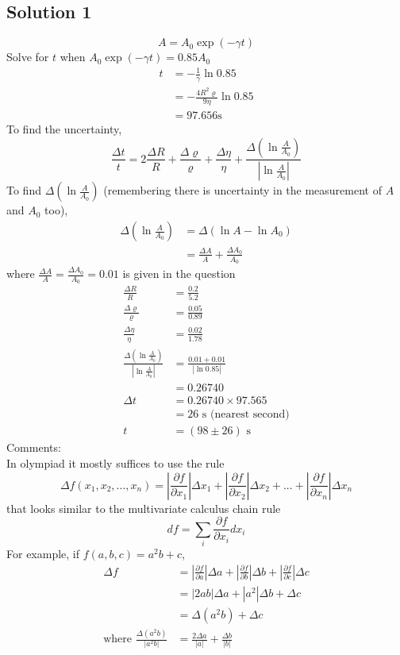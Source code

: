 \documentclass{article}
\begin{document}
\subsection{Solution 1}
\[A=A_0 \exp{(-\gamma t)}\]
Solve for $t$ when $A_0\exp{(-\gamma t)} = 0.85 A_0$
\begin{align}
	t &= -\frac{1}{\gamma} \ln{0.85} \\
	&= -\frac{4R^2\varrho}{9\eta} \ln{0.85} \\
	&= 97.656\text{s}
\end{align}
To find the uncertainty,
\[\frac{\Delta t}{t} = 2\frac{\Delta R}{R} + \frac{\Delta \varrho}{\varrho} + \frac{\Delta \eta}{\eta} + \frac{\Delta \left(\ln\frac{A}{A_0} \right)}{\left|\ln{\frac{A}{A_0}}\right|}\]
To find $\Delta \left(\ln{\frac{A}{A_0}}\right)$ (remembering there is uncertainty in the measurement of $A$ and $A_0$ too),
\begin{align}
	\Delta\left(\ln{\frac{A}{A_0}}\right) &= \Delta(\ln{A} -\ln{A_0}) \\
	&= \frac{\Delta A}{A} + \frac{\Delta A_0}{A_0}
\end{align}
where $\frac{\Delta A}{A} = \frac{\Delta A_0}{A_0} = 0.01$ is given in the question
\begin{align}
	\frac{\Delta R}{R} &= \frac{0.2}{5.2} \\
	\frac{\Delta \varrho}{\varrho} &= \frac{0.05}{0.89} \\
	\frac{\Delta \eta}{\eta} &= \frac{0.02}{1.78} \\
	\frac{\Delta \left(\ln\frac{A}{A_0} \right)}{\left|\ln{\frac{A}{A_0}}\right|} &= \frac{0.01 + 0.01}{ \left| \ln{0.85} \right| }\\
	&= 0.26740 \\
	\Delta t &= 0.26740 \times 97.565 \\
	&= 26 \text{ s (nearest second)} \\
	t &= (98 \pm 26) \text{ s}
\end{align}
Comments: \\
In olympiad it mostly suffices to use the rule \[\Delta f(x_1,x_2,...,x_n) = \left|\frac{\partial f}{\partial x_1}\right| \Delta x_1 + \left|\frac{\partial f}{\partial x_2}\right| \Delta x_2 +...+ \left|\frac{\partial f}{\partial x_n}\right| \Delta x_n \] that looks similar to the multivariate calculus chain rule \[df = \sum_i \frac{\partial f}{\partial x_i} dx_i\]
For example, if $f(a,b,c) = a^2b + c$,
\begin{align}
	\Delta f &= \left| \frac{\partial f}{\partial a} \right| \Delta a + \left| \frac{\partial f}{\partial b} \right| \Delta b + \left| \frac{\partial f }{\partial c} \right| \Delta c  \\
	&= |2ab| \Delta a + |a^2| \Delta b + \Delta c \\
	&= \Delta(a^2 b) + \Delta c\\
	\text{where } \frac{\Delta(a^2 b)}{|a^2 b|} &= \frac{2\Delta a}{|a|} + \frac{\Delta b}{|b|}
\end{align}
\end{document}
